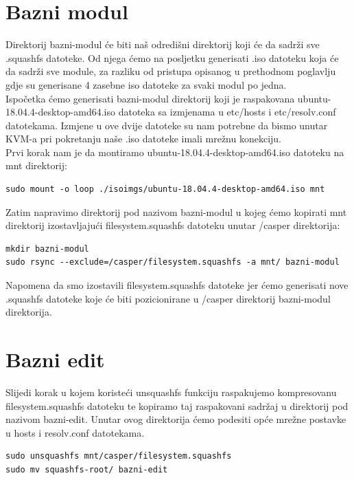 \documentclass[12pt,vi]{mitthesis}
\begin{document}
\section*{Bazni modul}
\indent
Direktorij bazni-modul će biti naš odredišni direktorij koji će da sadrži sve .squashfs datoteke. Od njega ćemo na posljetku generisati .iso datoteku koja će da sadrži sve module, za razliku od pristupa opisanog u prethodnom poglavlju gdje su generisane 4 zasebne iso datoteke za svaki modul po jedna.\\
Ispočetka ćemo generisati bazni-modul direktorij koji je raspakovana ubuntu-18.04.4-desktop-amd64.iso datoteka sa izmjenama u etc/hosts i etc/resolv.conf datotekama. Izmjene u ove dvije datoteke su nam potrebne da bismo unutar KVM-a pri pokretanju naše .iso datoteke imali mrežnu konekciju.\\
Prvi korak nam je da montiramo ubuntu-18.04.4-desktop-amd64.iso datoteku na mnt direktorij:
\begin{lstlisting}[style=BashInputStyle]
sudo mount -o loop ./isoimgs/ubuntu-18.04.4-desktop-amd64.iso mnt
\end{lstlisting}

Zatim napravimo direktorij pod nazivom bazni-modul u kojeg ćemo kopirati mnt direktorij izostavljajući filesystem.squashfs datoteku unutar /casper direktorija:
\begin{lstlisting}[style=BashInputStyle]
mkdir bazni-modul
sudo rsync --exclude=/casper/filesystem.squashfs -a mnt/ bazni-modul
\end{lstlisting}

Napomena da smo izostavili filesystem.squashfs datoteke jer ćemo generisati nove .squashfs datoteke koje će biti pozicionirane u /casper direktorij bazni-modul direktorija.

\section*{Bazni edit}
\indent
Slijedi korak u kojem koristeći unsquashfs funkciju raspakujemo kompresovanu filesystem.squashfs datoteku te kopiramo taj raspakovani sadržaj u direktorij pod nazivom bazni-edit. Unutar ovog direktorija ćemo podesiti opće mrežne postavke u hosts i resolv.conf datotekama.
\begin{lstlisting}[style=BashInputStyle]
sudo unsquashfs mnt/casper/filesystem.squashfs
sudo mv squashfs-root/ bazni-edit
\end{lstlisting}
\end{document}
